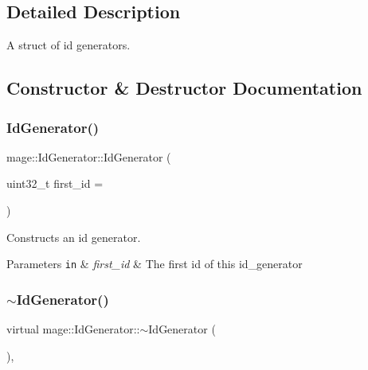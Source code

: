 \subsection{Detailed Description}
A struct of id generators. 

\subsection{Constructor \& Destructor Documentation}
\hypertarget{structmage_1_1_id_generator_aede1dd978436b3e108646896666e177e}{}\label{structmage_1_1_id_generator_aede1dd978436b3e108646896666e177e} 
\subsubsection{\texorpdfstring{Id\+Generator()}{IdGenerator()}\hspace{0.1cm}{\footnotesize\ttfamily [1/2]}}
{\footnotesize\ttfamily mage\+::\+Id\+Generator\+::\+Id\+Generator (\begin{DoxyParamCaption}\item[{uint32\+\_\+t}]{first\+\_\+id = {} }\end{DoxyParamCaption})}

Constructs an id generator.


\begin{DoxyParams}[1]{Parameters}
\mbox{\tt in}  & {\em first\+\_\+id} & The first id of this id\+\_\+generator \\
\hline
\end{DoxyParams}
\hypertarget{structmage_1_1_id_generator_a0ee9bddbf4cdedccc0fe70071c5c91b5}{}\label{structmage_1_1_id_generator_a0ee9bddbf4cdedccc0fe70071c5c91b5} 
\subsubsection{\texorpdfstring{$\sim$\+Id\+Generator()}{~IdGenerator()}}
{\footnotesize\ttfamily virtual mage\+::\+Id\+Generator\+::$\sim$\+Id\+Generator (\begin{DoxyParamCaption}{ }\end{DoxyParamCaption})\hspace{0.3cm}{\ttfamily [virtual]}, {\ttfamily [default]}}

